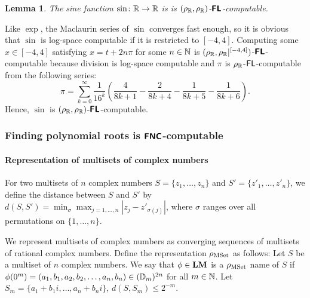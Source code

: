 \documentclass{article}
\newtheorem{lemma}[theorem]{Lemma}
\theoremstyle{definition}
\theoremstyle{remark}
\begin{document}
\begin{lemma}
  The sine function $\sin \colon \mathbb R \to \mathbb R$ is
 is $(\rho _\mathbb R, \rho _\mathbb R)$-$\text{\bfseries \sffamily \upshape FL}$-computable.
\end{lemma}
Like $\exp$, the Maclaurin series of $\sin$ converges fast enough,
so it is obvious that $\sin$ is log-space computable if it is restricted to $[-4, 4]$.
Computing some $x \in [-4, 4]$ satisfying $x = t + 2n\pi$ for 
some $n \in \mathbb N$ is
$(\rho _\mathbb R, \rho _\mathbb R|^{[-4,4]})$-$\text{\bfseries \sffamily \upshape FL}$-computable because division is log-space computable and $\pi$ is $\rho _\mathbb R$-$\mathsf{FL}$-computable from the following series:
\begin{equation}
 \pi = \sum_{k=0}^\infty \frac{1}{16^k} 
  \left( \frac{4}{8k+1} - \frac{2}{8k+4} - \frac{1}{8k+5} - \frac{1}{8k+6} \right).
\end{equation}
Hence, $\sin$ is $(\rho _\mathbb R, \rho _\mathbb R)$-$\text{\bfseries \sffamily \upshape FL}$-computable.



\subsubsection{Finding polynomial roots is \texorpdfstring{$\text{\bfseries \sffamily \upshape FNC}$}{FNC}-computable}

\paragraph{Representation of multisets of complex numbers}

For two multisets of $n$ complex numbers $S = \{z_1, \dots, z_n\}$ and $S' = \{z'_1, \dots, z'_n\}$,
we define the distance between $S$ and $S'$ by $
d(S, S') = \min_{\sigma} \max_{j = 1, \ldots, n}|z_j - z'_{\sigma(j)}|$,
where $\sigma$ ranges over all permutations on $\{1, \ldots, n\}$. 

We represent multisets of complex numbers as converging sequences of 
multisets of rational complex numbers.
Define the representation $\rho_{\mathrm{MSet}}$ as follows:
Let $S$ be a multiset of $n$ complex numbers. 
We say that $\phi \in \mathbf{LM}$ is a $\rho_{\mathrm{MSet}}$ name of $S$ if
$\phi(0^m) = ( a_1, b_1, a_2, b_2, \dots, a_n, b_n ) \in (\mathbb D_m)^{2n}$
for all $m \in \mathbb N$.
Let $S_m = \{a_1+b_1 i, \dots, a_n+b_n i\}$, 
$d(S, S_m) \le 2^{-m}$.

\end{document}
